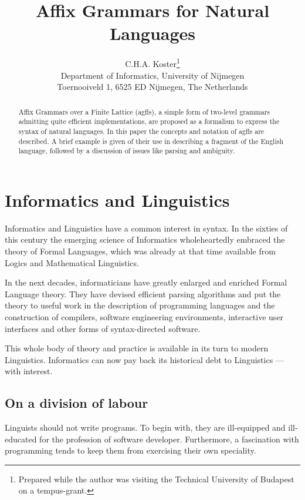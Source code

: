 \setlength{\topmargin}{0cm}
\setlength{\topsep}{2mm}
\setlength{\oddsidemargin}{0cm}
\setlength{\evensidemargin}{0cm}
\setlength{\textheight}{23.5cm}
\setlength{\textwidth}{16cm}

\pagestyle{empty}
\title{\protect\vspace{-1.5cm}Affix Grammars for Natural Languages}
\author{C.H.A. Koster\thanks{Prepared while the author was visiting the
Technical University of Budapest on a {\sc tempus}-grant.}\\
Department of Informatics, University of Nijmegen\\
Toernooiveld 1, 6525 ED Nijmegen, The Netherlands}
\date{}

\maketitle
\begin{abstract}
Affix Grammars over a Finite Lattice ({\sc agfl}s), a simple form of two-level
grammars admitting quite efficient implementations, are proposed as a
formalism to express the syntax of natural languages. In this
paper the concepts and notation of {\sc agfl}s are described. A brief example
is given of their use in describing a fragment of the English language,
followed by a discussion of issues like parsing and ambiguity.
\end{abstract}
\section{Informatics and Linguistics}
Informatics and Linguistics have a common interest in syntax.
In the sixties of this century
the emerging science of Informatics wholeheartedly embraced the theory
of Formal Languages, which was already at that time available from
Logics and Mathematical Linguistics.

In the next decades, informaticians
have greatly enlarged and enriched Formal Language theory. They have
devised efficient
parsing algorithms and put the theory to useful work in the description
of programming languages and the construction of compilers, software
engineering environments, interactive user interfaces and other forms
of syntax-directed software.

This whole body of theory and practice is available in its turn to
modern Linguistics. Informatics can now pay back its historical debt
to Linguistics --- with interest.
\subsection{On a division of labour}
Linguists should not write programs. To begin with, they are ill-equipped
and ill-educated for the profession of software developer. Furthermore,
a fascination with programming
tends to keep them from exercising their own speciality. 

